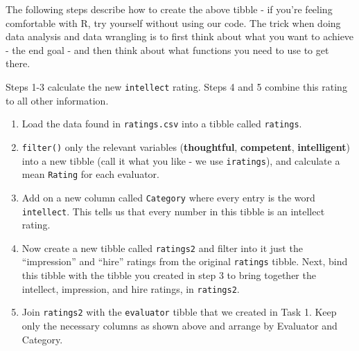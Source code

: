 \documentclass[]{book}
\begin{document}
The following steps describe how to create the above tibble - if you're feeling comfortable with R, try yourself without using our code. The trick when doing data analysis and data wrangling is to first think about what you want to achieve - the end goal - and then think about what functions you need to use to get there.

Steps 1-3 calculate the new \texttt{intellect} rating. Steps 4 and 5 combine this rating to all other information.

\begin{enumerate}
\def\labelenumi{\arabic{enumi}.}
\item
  Load the data found in \texttt{ratings.csv} into a tibble called \texttt{ratings}.
\item
  \texttt{filter()} only the relevant variables (\textbf{thoughtful}, \textbf{competent}, \textbf{intelligent}) into a new tibble (call it what you like - we use \texttt{iratings}), and calculate a mean \texttt{Rating} for each evaluator.
\item
  Add on a new column called \texttt{Category} where every entry is the word \texttt{intellect}. This tells us that every number in this tibble is an intellect rating.
\item
  Now create a new tibble called \texttt{ratings2} and filter into it just the ``impression'' and ``hire'' ratings from the original \texttt{ratings} tibble. Next, bind this tibble with the tibble you created in step 3 to bring together the intellect, impression, and hire ratings, in \texttt{ratings2}.
\item
  Join \texttt{ratings2} with the \texttt{evaluator} tibble that we created in Task 1. Keep only the necessary columns as shown above and arrange by Evaluator and Category.
\end{enumerate}
\end{document}
